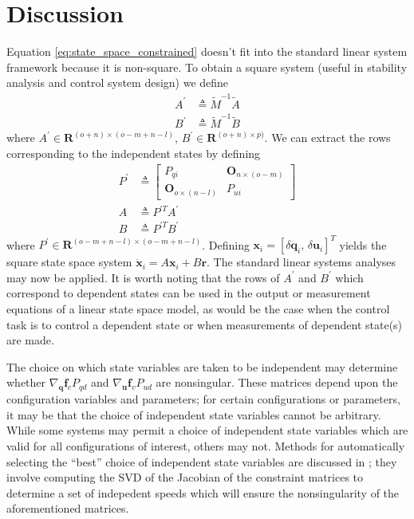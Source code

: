 \documentclass{svjour3}                     %
\begin{document}
\section{Discussion}
\label{sec:discussion}
Equation \ref{eq:state_space_constrained} doesn't fit into the standard linear
system framework because it is non-square.  To obtain a square system (useful
in stability analysis and control system design) we define
\begin{align}
    A^\prime &\triangleq \tilde{M}^{-1} \tilde{A} \\
    B^\prime &\triangleq \tilde{M}^{-1} \tilde{B}
\end{align}
where  $A^\prime \in \bm{R}^{(o + n) \times (o - m + n -l)}$, $B^\prime \in
\bm{R}^{(o + n) \times p)}$.  We can extract the rows corresponding to the
independent states by defining
\begin{align}
    P^\prime &\triangleq \begin{bmatrix}
        P_{qi} & \bm{O}_{n \times (o - m)} \\
        \bm{O}_{o \times (n - l)} & P_{ui}
    \end{bmatrix} \\
    A &\triangleq P^{\prime T} A^\prime \\
    B &\triangleq P^{\prime T} B^\prime
\end{align}
where $P^\prime \in \bm{R}^{(o - m + n - l) \times (o - m + n - l)}$.  Defining
$\bm{x}_i = \left[\delta\bm{q}_i,\,\delta\bm{u}_i\right]^{T}$ yields the square
state space system $\dot{\bm{x}}_i = A \bm{x}_i + B \bm{r}$.  The standard
linear systems analyses may now be applied.  It is worth noting that the rows
of $A^\prime$ and $B^\prime$ which correspond to dependent states can be used
in the output or measurement equations of a linear state space model, as would
be the case when the control task is to control a dependent state or when
measurements of dependent state(s) are made.

The choice on which state variables are taken to be independent may determine
whether $\nabla_{\bm{q}}\bm{f}_{c} P_{qd}$ and $\nabla_{\bm{u}} \bm{f}_{v}
P_{ud}$ are nonsingular.  These matrices depend upon the
configuration variables and parameters; for certain configurations or
parameters, it may be that the choice of independent state variables cannot be
arbitrary.  While some systems may permit a choice of independent state
variables which are valid for all configurations of interest, others may not.
Methods for automatically selecting the ``best'' choice of independent state
variables are discussed in \cite{Reckdahl1996}; they involve computing
the SVD of the Jacobian of the constraint matrices to determine a set of
indepedent speeds which will ensure the nonsingularity of the aforementioned
matrices.
\end{document}
